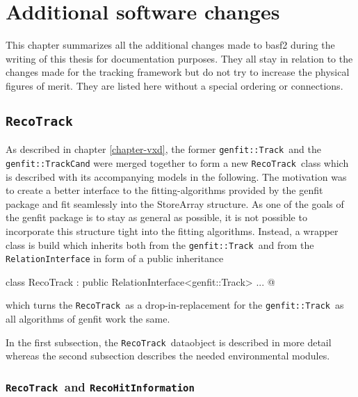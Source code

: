 \newcommand{\RecoTrack}{\texttt{RecoTrack}\ }
\newcommand{\Track}{\texttt{genfit::Track}\ }
\newcommand{\Hit}{\texttt{RecoHitInformation}\ }
\chapter{Additional software changes} \label{chapter-addon}

This chapter summarizes all the additional changes made to basf2 during the writing of this thesis for documentation purposes. They all stay in relation to the changes made for the tracking framework but do not try to increase the physical figures of merit. They are listed here without a special ordering or connections.

\section{\texttt{RecoTrack}}
As described in chapter \ref{chapter-vxd}, the former \Track and the \texttt{genfit::TrackCand} were merged together to form a new \RecoTrack class which is described with its accompanying models in the following. The motivation was to create a better interface to the fitting-algorithms provided by the genfit package and fit seamlessly into the StoreArray structure. As one of the goals of the genfit package is to stay as general as possible, it is not possible to incorporate this structure tight into the fitting algorithms. Instead, a wrapper class is build which inherits both from the \Track and from the \texttt{RelationInterface} in form of a public inheritance 
\begin{center}
  \lstset{escapechar=@,style=customC}
  \lstinline@ class RecoTrack : public RelationInterface<genfit::Track> { ... }@
\end{center}
which turns the \RecoTrack as a drop-in-replacement for the \Track as all algorithms of genfit work the same. 

In the first subsection, the \RecoTrack dataobject is described in more detail whereas the second subsection describes the needed environmental modules.

\subsection{\RecoTrack and \Hit}

